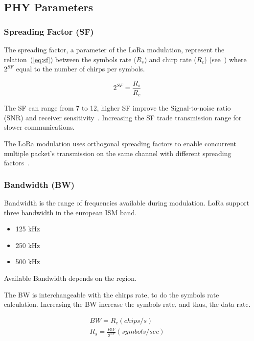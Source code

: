 \subsection{PHY Parameters}

\subsubsection{Spreading Factor (SF)}

The spreading factor, a parameter of the LoRa modulation, represent the
relation~(\ref{eq:sf}) between the symbols rate ($R_{s}$) and chirp rate ($R_{c}$)
(see~\cite{semtech:modemdesign}) where $2^{SF}$ equal to the number of chirps per
symbols.

\begin{equation}
 \label{eq:sf} 
  2^{SF} = \frac{R_s}{R_c}
\end{equation}

The SF can range from 7 to 12, higher SF improve the Signal-to-noise ratio
(SNR) and receiver sensitivity~\cite{semtech:modemdesign}.
Increasing the SF trade transmission range for slower communications.

The LoRa modulation uses orthogonal spreading factors to enable concurrent multiple
packet's transmission on the same channel with different
spreading factors~\cite{semtech:modulationbasics}.

\subsubsection{Bandwidth (BW)}

Bandwidth is the range of frequencies available during modulation.
LoRa support three bandwidth in the european ISM band.

\begin{itemize}
    \item 125 kHz
    \item 250 kHz
    \item 500 kHz
\end{itemize}

Available Bandwidth depends on the region. %

The BW is interchangeable with the chirps rate, to do the symbols rate
calculation.
Increasing the BW increase the symbols rate, and thus, the data rate.

\begin{gather}
 \label{eq:bw} 
  BW = R_c (chips/s) \\
  R_s = \frac{BW}{2^{SF}} (symbols / sec)
\end{gather}

